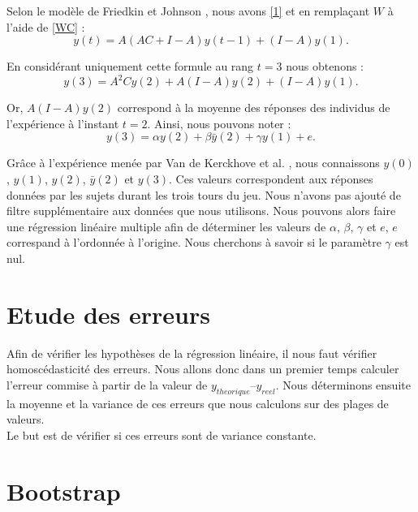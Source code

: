 \documentclass{scrreprt}
\begin{document}
\begin{multicols}{2}
Selon le modèle de Friedkin et Johnson \cite{FJ}, nous avons \eqref{1} et en remplaçant $W$ à l’aide de \eqref{WC} :\\

\begin{equation}
\label{21}
y(t) =A(AC+I-A)y(t-1)+(I-A)y(1).
\end{equation}

En considérant uniquement cette formule au rang $t = 3$ nous obtenons :\\
\begin{equation}
\label{22}
y(3) = A^2C y(2) + A(I-A)y(2) + (I-A)y(1).
\end{equation}

Or, $A(I-A)y(2)$ correspond à la moyenne des réponses des individus de l'expérience à l'instant $t=2$. Ainsi, nous pouvons noter :\\
\begin{equation}
\label{23}
y(3) = \alpha y(2) + \beta \bar{y}(2) + \gamma y(1) + e.
\end{equation}

Grâce à l’expérience menée par Van de Kerckhove et al. \cite{VMG}, nous connaissons $y(0)$, $y(1)$, $y(2)$, $\bar{y}(2)$ et $y(3)$. Ces valeurs correspondent aux réponses données par les sujets durant les trois tours du jeu. Nous n’avons pas ajouté de filtre supplémentaire aux données que nous utilisons. Nous pouvons alors faire une régression linéaire multiple afin de déterminer les valeurs de $\alpha$, $\beta$, $\gamma$ et $e$, $e$ correspand à l'ordonnée à l'origine. Nous cherchons à savoir si le paramètre $\gamma$ est nul.\\

\section{Etude des erreurs}

Afin de vérifier les hypothèses de la régression linéaire, il nous faut vérifier homoscédasticité des erreurs. Nous allons donc dans un premier temps calculer l’erreur commise à partir de la valeur de $y_{theorique} – y_{reel}$. Nous déterminons ensuite la moyenne et la variance de ces erreurs que nous calculons sur des plages de valeurs.\\

Le but est de vérifier si ces erreurs sont de variance constante.\\

\section{Bootstrap}


\end{multicols}
\end{document}
